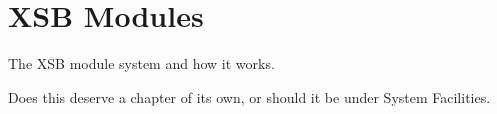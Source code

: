 \chapter{XSB Modules}

The XSB module system and how it works.

Does this deserve a chapter of its own, or should it be under System
Facilities.
